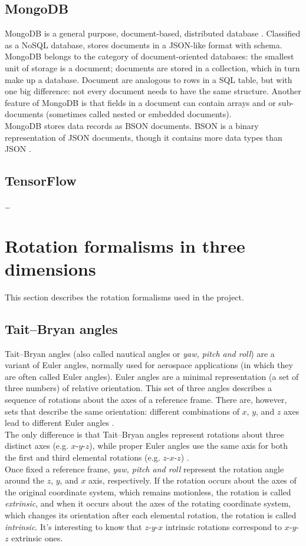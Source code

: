 \subsection{MongoDB}
MongoDB is a general purpose, document-based, distributed database \cite{MongoDB}. Classified as a NoSQL database, stores documents in a JSON-like format with schema. MongoDB belongs to the category of document-oriented databases: the smallest unit of storage is a document; documents are stored in a collection, which in turn make up a database. Document are analogous to rows in a SQL table, but with one big difference: not every document needs to have the same structure. Another feature of MongoDB is that fields in a document can contain arrays and or sub-documents (sometimes called nested or embedded documents).\\
MongoDB stores data records as BSON documents. BSON is a binary representation of JSON documents, though it contains more data types than JSON \cite{BSONSpec}.

\subsection{TensorFlow}
\dots

\section{Rotation formalisms in three dimensions}
This section describes the rotation formalisms used in the project.

\subsection{Tait–Bryan angles}
Tait–Bryan angles (also called nautical angles or \textit{yaw, pitch and roll}) are a variant of Euler angles, normally used for aerospace applications (in which they are often called Euler angles). Euler angles are a minimal representation (a set of three numbers) of relative orientation. This set of three angles describes a sequence of rotations about the axes of a reference frame. There are, however, sets that describe the same orientation: different combinations of $x$, $y$, and $z$ axes lead to different Euler angles \cite{Rob20}.\\
The only difference is that Tait–Bryan angles represent rotations about three distinct axes (e.g. $x$-$y$-$z$), while proper Euler angles use the same axis for both the first and third elemental rotations (e.g. $z$-$x$-$z$) \cite{WikipediaEulerAngles}.\\
Once fixed a reference frame, \textit{yaw, pitch and roll} represent the rotation angle around the $z$, $y$, and $x$ axis, respectively.
If the rotation occurs about the axes of the original coordinate system, which remains motionless, the rotation is called \textit{extrinsic}, and when it occurs about the axes of the rotating coordinate system, which changes its orientation after each elemental rotation, the rotation is called \textit{intrinsic}. It's interesting to know that $z$-$y$-$x$ intrinsic rotations correspond to $x$-$y$-$z$ extrinsic ones.

